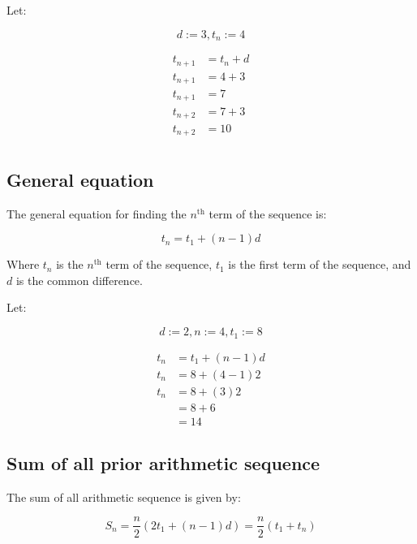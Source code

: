 \documentclass{book}
\newenvironment{generalInformation}{}{}
\newenvironment{explanationOfTerms}{}{}
\newenvironment{example}{}{}
\begin{document}
\begin{example}
	Let:

	\[
		d := 3, t_n := 4
	\]

	\begin{align*}
		t_{n + 1} & = t_n + d \\
		t_{n + 1} & = 4 + 3   \\
		t_{n + 1} & = 7       \\
		t_{n + 2} & = 7 + 3   \\
		t_{n + 2} & = 10      \\
	\end{align*}
\end{example}


\subsection{General equation}
\begin{generalInformation}
	The general equation for finding the $n^{\text{th}}$ term of the sequence is:
\end{generalInformation}

\[
	t_n = t_1 + (n - 1)d
\]

\begin{explanationOfTerms}
	Where $t_n$ is the $n^{\text{th}}$ term of the sequence, $t_1$ is the first term of the sequence, and $d$ is the common difference.
\end{explanationOfTerms}

\begin{example}
	Let:

	\[
		d := 2, n := 4, t_1 := 8
	\]

	\begin{align*}
		t_n & = t_1 + (n - 1)d \\
		t_n & = 8 + (4 - 1)2   \\
		t_n & = 8 + (3)2       \\
		    & = 8 + 6          \\
		    & = 14
	\end{align*}
\end{example}


\subsection{Sum of all prior arithmetic sequence}
The sum of all arithmetic sequence is given by:

\[
	S_n = \frac{n}{2}(2t_1 + (n - 1)d) = \frac{n}{2}(t_1 + t_n)
\]
\end{document}
